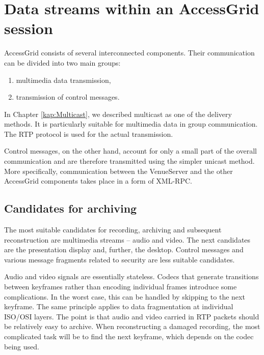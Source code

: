 \section{Data streams within an AccessGrid session}

AccessGrid consists of several interconnected components. Their communication can be divided into two main groups:
\begin{enumerate}
\item multimedia data transmission,
\item transmission of control messages.
\end{enumerate}

In Chapter \ref{kap:Multicast}, we described multicast as one of the delivery methods. It is particularly suitable for multimedia data in group communication. The RTP protocol is used for the actual transmission.

Control messages, on the other hand, account for only a small part of the overall communication and are therefore transmitted using the simpler unicast method. More specifically, communication between the VenueServer and the other AccessGrid components takes place in a form of XML-RPC.

\subsection{Candidates for archiving}

The most suitable candidates for recording, archiving and subsequent reconstruction are multimedia streams -- audio and video. The next candidates are the presentation display and, further, the desktop. Control messages and various message fragments related to security are less suitable candidates.


Audio and video signals are essentially stateless. Codecs that generate transitions between keyframes rather than encoding individual frames introduce some complications. In the worst case, this can be handled by skipping to the next keyframe. The same principle applies to data fragmentation at individual ISO/OSI layers. The point is that audio and video carried in RTP packets should be relatively easy to archive. When reconstructing a damaged recording, the most complicated task will be to find the next keyframe, which depends on the codec being used.


